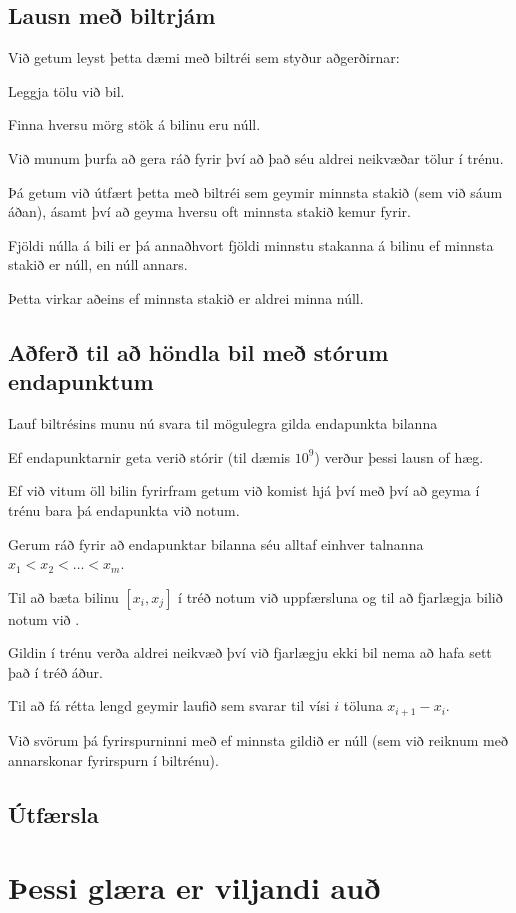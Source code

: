 \subsection{Lausn með biltrjám}
{
	{
		\item<1-> Við getum leyst þetta dæmi með biltréi sem styður aðgerðirnar:
		{
			\item<2-> Leggja tölu við bil.
			\item<3-> Finna hversu mörg stök á bilinu eru núll.
		}
		\item<4-> Við munum þurfa að gera ráð fyrir því að það séu aldrei neikvæðar tölur í trénu.
		\item<5-> Þá getum við útfært þetta með biltréi sem geymir minnsta stakið (sem við sáum áðan),
					ásamt því að geyma hversu oft minnsta stakið kemur fyrir.
		\item<6-> Fjöldi núlla á bili er þá annaðhvort fjöldi minnstu stakanna á bilinu ef minnsta stakið er núll, en núll annars.
		\item<7-> Þetta virkar aðeins ef minnsta stakið er aldrei minna núll.
	}
}

\subsection{Aðferð til að höndla bil með stórum endapunktum}
{
	{
		\item<1-> Lauf biltrésins munu nú svara til mögulegra gilda endapunkta bilanna
		\item<2-> Ef endapunktarnir geta verið stórir (til dæmis $10^9$) verður þessi lausn of hæg.
		\item<3-> Ef við vitum öll bilin fyrirfram getum við komist hjá því með því að geyma í trénu bara þá endapunkta við notum.
		\item<4-> Gerum ráð fyrir að endapunktar bilanna séu alltaf einhver talnanna $x_1 < x_2 < \dots < x_m$.
		\item<5-> Til að bæta bilinu $[x_i, x_j]$ í tréð notum við uppfærsluna 
					og til að fjarlægja bilið notum við .
		\item<6-> Gildin í trénu verða aldrei neikvæð því við fjarlægju ekki bil nema að hafa sett það í tréð áður.
		\item<7-> Til að fá rétta lengd geymir laufið sem svarar til vísi $i$ töluna $x_{i + 1} - x_i$.
		\item<8-> Við svörum þá fyrirspurninni með  ef minnsta gildið er núll (sem við reiknum með annarskonar fyrirspurn í biltrénu).
	}
}

\subsection{Útfærsla}
{
}

{
}

{
}

\section{Þessi glæra er viljandi auð}
{
}


